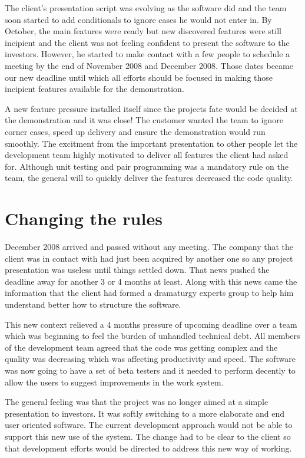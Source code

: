 \documentclass[lnbip]{svmultln}
\begin{document}
The client's presentation script was evolving as the software did and
the team soon started to add conditionals to ignore cases he would not
enter in. By October, the main features were ready but new discovered
features were still incipient and the client was not feeling confident
to present the software to the investors. However, he started to make
contact with a few people to schedule a meeting by the end of November
2008 and December 2008. Those dates became our new deadline until
which all efforts should be focused in making those incipient features
available for the demonstration.

A new feature pressure installed itself since the projects fate would
be decided at the demonstration and it was close! The customer wanted
the team to ignore corner cases, speed up delivery and ensure the
demonstration would run smoothly. The excitment from the important
presentation to other people let the development team highly motivated
to deliver all features the client had asked for. Although unit
testing and pair programming was a mandatory rule on the team, the
general will to quickly deliver the features decreased the code
quality.

\section{Changing the rules}
\label{sec:changes}

December 2008 arrived and passed without any meeting. The company that
the client was in contact with had just been acquired by another one
so any project presentation was useless until things settled
down. That news pushed the deadline away for another 3 or 4 months at
least. Along with this news came the information that the client had
formed a dramaturgy experts group to help him understand better how to
structure the software.

This new context relieved a 4 months pressure of upcoming deadline
over a team which was beginning to feel the burden of unhandled
technical debt. All members of the development team agreed that the
code was getting complex and the quality was decreasing which was
affecting productivity and speed. The software was now going to have a
set of beta testers and it needed to perform decently to allow the
users to suggest improvements in the work system.

The general feeling was that the project was no longer aimed at a
simple presentation to investors. It was softly switching to a more
elaborate and end user oriented software. The current development
approach would not be able to support this new use of the system. The
change had to be clear to the client so that development efforts would
be directed to address this new way of working.
\end{document}
